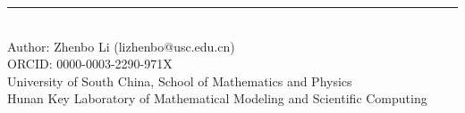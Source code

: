 \documentclass[11pt,a4paper]{article}
\begin{document}
\vfill
\begin{center}
\small\rule{0.5\textwidth}{0.3pt}\\[4pt]
\small\color{primary} Author: Zhenbo Li (lizhenbo@usc.edu.cn)\\
\small ORCID: 0000-0003-2290-971X\\
\small University of South China, School of Mathematics and Physics\\
\small Hunan Key Laboratory of Mathematical Modeling and Scientific Computing
\end{center}
\end{document}
